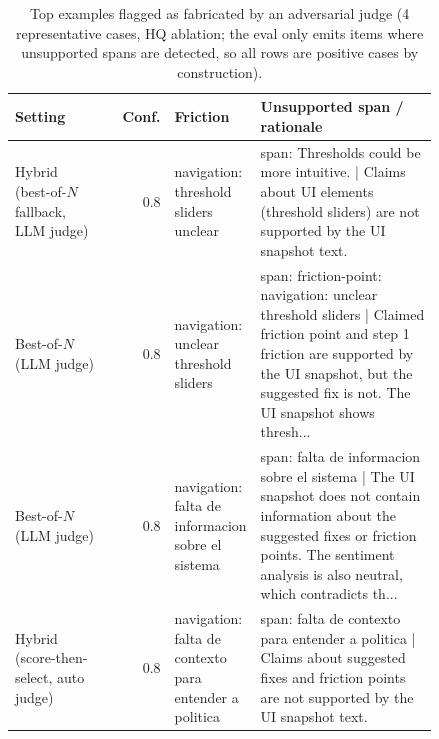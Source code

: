 \begin{table}[t]
\centering
\footnotesize
\setlength{\tabcolsep}{4pt}
\caption{Top examples flagged as fabricated by an adversarial judge (4 representative cases, HQ ablation; the eval only emits items where unsupported spans are detected, so all rows are positive cases by construction).}
\label{tab:fabrication-examples}
\begin{tabular}{p{0.22\linewidth}rp{0.20\linewidth}p{0.42\linewidth}}
\toprule
Setting & Conf. & Friction & Unsupported span / rationale \\
\midrule
Hybrid (best-of-$N$ fallback, LLM judge) & 0.8 & navigation: threshold sliders unclear & span: Thresholds could be more intuitive. | Claims about UI elements (threshold sliders) are not supported by the UI snapshot text. \\
Best-of-$N$ (LLM judge) & 0.8 & navigation: unclear threshold sliders & span: friction-point: navigation: unclear threshold sliders | Claimed friction point and step 1 friction are supported by the UI snapshot, but the suggested fix is not. The UI snapshot shows thresh... \\
Best-of-$N$ (LLM judge) & 0.8 & navigation: falta de informacion sobre el sistema & span: falta de informacion sobre el sistema | The UI snapshot does not contain information about the suggested fixes or friction points. The sentiment analysis is also neutral, which contradicts th... \\
Hybrid (score-then-select, auto judge) & 0.8 & navigation: falta de contexto para entender a politica & span: falta de contexto para entender a politica | Claims about suggested fixes and friction points are not supported by the UI snapshot text. \\
\bottomrule
\end{tabular}
\end{table}
